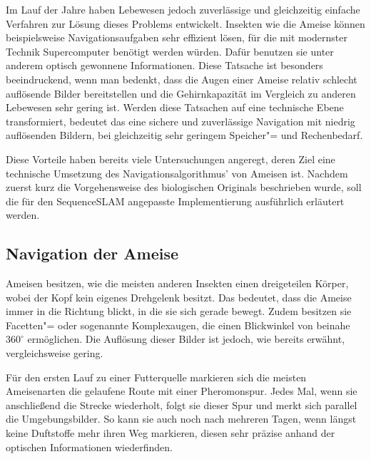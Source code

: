\documentclass[12pt,a4paper,titlepage]{scrartcl}
\begin{document}
Im Lauf der Jahre haben Lebewesen jedoch zuverlässige und gleichzeitig einfache Verfahren zur Lösung dieses Problems entwickelt. Insekten wie die Ameise können beispielsweise Navigationsaufgaben sehr effizient lösen, für die mit modernster Technik Supercomputer benötigt werden würden. Dafür benutzen sie unter anderem optisch gewonnene Informationen. Diese Tatsache ist besonders beeindruckend, wenn man bedenkt, dass die Augen einer Ameise relativ schlecht auflösende Bilder bereitstellen und die Gehirnkapazität im Vergleich zu anderen Lebewesen sehr gering ist. Werden diese Tatsachen auf eine technische Ebene transformiert, bedeutet das eine sichere und zuverlässige Navigation mit niedrig auflösenden Bildern, bei gleichzeitig sehr geringem Speicher"= und Rechenbedarf.

Diese Vorteile haben bereits viele Untersuchungen angeregt, deren Ziel eine technische Umsetzung des Navigationsalgorithmus' von Ameisen ist. Nachdem zuerst kurz die Vorgehensweise des biologischen Originals beschrieben wurde, soll die für den SequenceSLAM angepasste Implementierung ausführlich erläutert werden. 
\subsection{Navigation der Ameise}
Ameisen besitzen, wie die meisten anderen Insekten einen dreigeteilen Körper, wobei der Kopf kein eigenes Drehgelenk besitzt. Das bedeutet, dass die Ameise immer in die Richtung blickt, in die sie sich gerade bewegt. Zudem besitzen sie Facetten"= oder sogenannte Komplexaugen, die einen Blickwinkel von beinahe $360^{\circ}$ ermöglichen. Die Auflösung dieser Bilder ist jedoch, wie bereits erwähnt, vergleichsweise gering. 

Für den ersten Lauf zu einer Futterquelle markieren sich die meisten Ameisenarten die gelaufene Route mit einer Pheromonspur. Jedes Mal, wenn sie anschließend die Strecke wiederholt, folgt sie dieser Spur und merkt sich parallel die Umgebungsbilder. So kann sie auch noch nach mehreren Tagen, wenn längst keine Duftstoffe mehr ihren Weg markieren, diesen sehr präzise anhand der optischen Informationen wiederfinden. 
\end{document}
